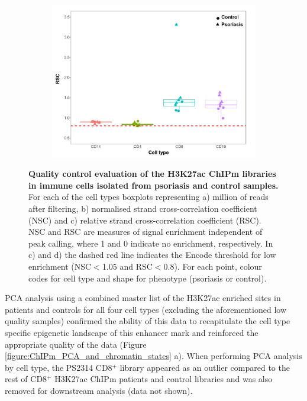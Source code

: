 \begin{figure}[htbp]
\begin{subfigure}{0.5\textwidth}
\centering
\includegraphics[width=\textwidth]{./Results2/pdfs/ChIPm_PS_CTL_RSC_boxplot}
\caption{\textbf{}}
\end{subfigure}
\caption[Quality control evaluation of the H3K27ac ChIPm libraries in immune cells isolated from psoriasis and control samples.]{\textbf{Quality control evaluation of the H3K27ac ChIPm libraries in immune cells isolated from psoriasis and control samples.} For each of the cell types boxplots representing a) million of reads after filtering, b) normalised strand cross-correlation coefficient (NSC) and c) relative strand cross-correlation coefficient (RSC). NSC and RSC are measures of signal enrichment independent of peak calling, where 1 and 0 indicate no enrichment, respectively. In c) and d) the dashed red line indicates the Encode threshold for low enrichment (NSC$<$1.05 and RSC$<$0.8). For each point, colour codes for cell type and shape for phenotype (psoriasis or control).}
\label{figure:ChIPm_PS_CTL_QC}
\end{figure} 




PCA analysis using a combined master list of the H3K27ac enriched sites in patients and controls for all four cell types (excluding the aforementioned low quality samples) confirmed the ability of this data to recapitulate the cell type specific epigenetic landscape of this enhancer mark and reinforced the appropriate quality of the data (Figure \ref{figure:ChIPm_PCA_and_chromatin_states} a). When performing PCA analysis by cell type, the PS2314 CD8$^+$ library appeared as an outlier compared to the rest of CD8$^+$ H3K27ac ChIPm patients and control libraries and was also removed for downstream analysis (data not shown). 

